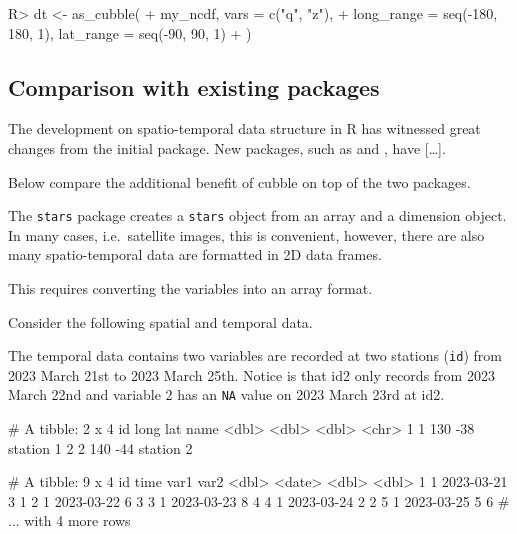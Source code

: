 \documentclass[
  shortnames]{jss}
\begin{document}
\begin{CodeChunk}
\begin{CodeInput}
R> dt <- as_cubble(
+   my_ncdf, vars = c("q", "z"),
+   long_range = seq(-180, 180, 1), lat_range = seq(-90, 90, 1)
+   )
\end{CodeInput}
\end{CodeChunk}

\hypertarget{comparison-with-existing-packages}{%
\subsection{Comparison with existing packages}\label{comparison-with-existing-packages}}

The development on spatio-temporal data structure in R has witnessed great changes from the initial  \citep{spacetime} package. New packages, such as  \citep{stars} and  \citep{sftime}, have {[}\ldots{]}.

Below compare the additional benefit of cubble on top of the two packages.

The \texttt{stars} package creates a \texttt{stars} object from an array and a dimension object. In many cases, i.e.~satellite images, this is convenient, however, there are also many spatio-temporal data are formatted in 2D data frames.

This requires converting the variables into an array format.

Consider the following spatial and temporal data.

The temporal data contains two variables are recorded at two stations (\texttt{id}) from 2023 March 21st to 2023 March 25th. Notice is that id2 only records from 2023 March 22nd and variable 2 has an \texttt{NA} value on 2023 March 23rd at id2.

\begin{CodeChunk}
\begin{CodeOutput}
# A tibble: 2 x 4
     id  long   lat name     
  <dbl> <dbl> <dbl> <chr>    
1     1   130   -38 station 1
2     2   140   -44 station 2
\end{CodeOutput}
\begin{CodeOutput}
# A tibble: 9 x 4
     id time        var1  var2
  <dbl> <date>     <dbl> <dbl>
1     1 2023-03-21     3     1
2     1 2023-03-22     6     3
3     1 2023-03-23     8     4
4     1 2023-03-24     2     2
5     1 2023-03-25     5     6
# ... with 4 more rows
\end{CodeOutput}
\end{CodeChunk}
\end{document}
